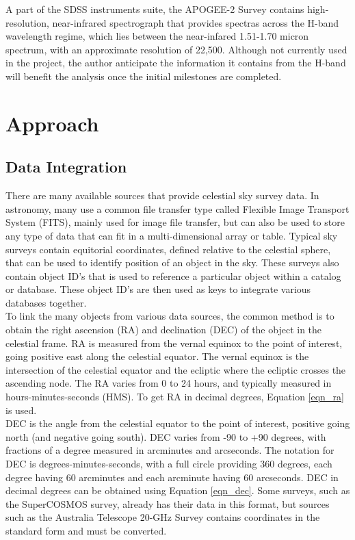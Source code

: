 \documentclass[11pt,sigconf]{acmart}
\begin{document}
A part of the SDSS instruments suite, the APOGEE-2 Survey
contains high-resolution, near-infrared spectrograph that provides spectras across the 
H-band wavelength regime, which lies between the near-infared 1.51-1.70 micron spectrum, 
with an approximate resolution of 22,500. Although not currently used in the project,
the author anticipate the information it contains from the H-band will benefit the
analysis once the initial milestones are completed. 
\\

\section{Approach}

\subsection{Data Integration}
There are many available sources that provide celestial sky survey data. In astronomy,
many use a common file transfer type called Flexible Image Transport System (FITS), 
mainly used for image file transfer, but can also be used to store any type of data 
that can fit in a multi-dimensional array or table. Typical sky surveys contain 
equitorial coordinates, defined relative to the celestial sphere, that can be used to 
identify position of an object in the sky. These surveys also contain object ID's that 
is used to reference a particular object within a catalog or database. These object 
ID's are then used as keys to integrate various databases together. 
\\
To link the many objects from various data sources, the common method is to obtain
the right ascension (RA) and declination (DEC) of the object in the celestial frame. 
RA is measured from the vernal equinox to the point of interest, going positive east
along the celestial equator. The vernal equinox is the intersection of the celestial 
equator and the ecliptic where the ecliptic crosses the ascending node. The RA varies 
from 0 to 24 hours, and typically measured in hours-minutes-seconds (HMS). To get RA 
in decimal degrees, Equation \ref{eqn_ra} is used. 
\\
DEC is the angle from the celestial equator to the point of interest, positive going 
north (and negative going south). DEC varies from -90 to +90 degrees, with fractions 
of a degree measured in arcminutes and arcseconds. The notation for DEC is 
degrees-minutes-seconds, with a full circle providing 360 degrees, each degree having 
60 arcminutes and each arcminute having 60 arcseconds. DEC in decimal degrees can be 
obtained using Equation \ref{eqn_dec}. Some surveys, such as the SuperCOSMOS survey, 
already has their data in this format, but sources such as the Australia Telescope 
20-GHz Survey contains coordinates in the standard form and must be converted.
\end{document}
